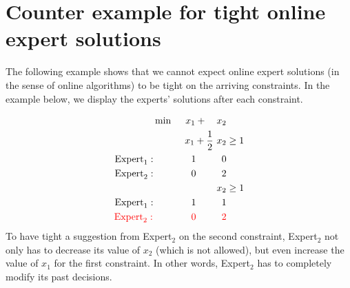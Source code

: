 
\section{Counter example for tight online expert solutions} \label{appix-tight-solutions}

The following example shows that we cannot expect online expert solutions (in the sense of online algorithms)
to be tight on the arriving constraints. In the example below, we display the experts' solutions after each constraint.

\begin{align*}
    \min\ \ \ \ x_{1} + \ \ \ x_{2} & \\
    x_{1} + \frac{1}{2}\ x_{2} & \ge 1 \\
    \textnormal{Expert}_{1}: \ \ \ \ \ \ \ \ \ \ \ 1 \ \ \ \ \ \ \ \ 0 & \\
    \textnormal{Expert}_{2}: \ \ \ \ \ \ \ \ \ \ \ 0 \ \ \ \ \ \ \ \ 2 & \\
    x_{2} & \ge 1 \\
    \textnormal{Expert}_{1}: \ \ \ \ \ \ \ \ \ \ \ 1 \ \ \ \ \ \ \ \ 1 & \\
    {\color{red}\textnormal{Expert}_{2}:} \ \ \ \ \ \ \ \ \ \ \ \ {\color{red} 0} \ \ \ \ \ \ \ \ {\color{red} 2} & \\
\end{align*}
%
To have tight a suggestion from Expert$_2$ on the second constraint, Expert$_2$ not only has to decrease its value of $x_{2}$ (which is not allowed), but even increase the value of $x_{1}$ for the first constraint. In other words, Expert$_2$ has to completely modify its past decisions.
